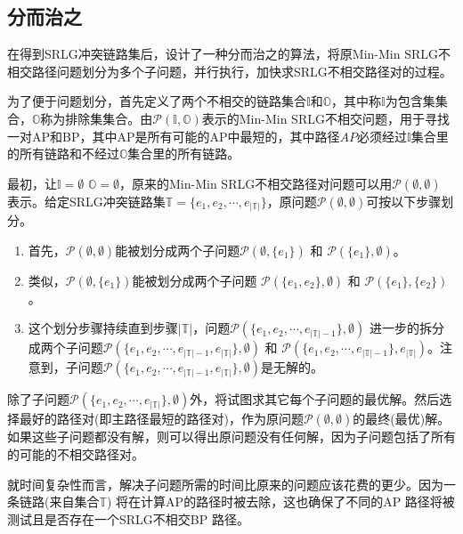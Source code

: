 \subsection{分而治之}
在得到SRLG冲突链路集后，设计了一种分而治之的算法，将原Min-Min SRLG不相交路径问题划分为多个子问题，并行执行，加快求SRLG不相交路径对的过程。

为了便于问题划分，首先定义了两个不相交的链路集合$\mathbb{I}$和$\mathbb{O}$，其中称$\mathbb{I}$为包含集集合，$\mathbb{O}$称为排除集集合。由$\mathcal{P}({\mathbb{I},\mathbb{O}})$表示的Min-Min SRLG不相交问题，用于寻找一对AP和BP，其中AP是所有可能的AP中最短的，其中路径$AP$必须经过$\mathbb{I}$集合里的所有链路和不经过$\mathbb{O}$集合里的所有链路。

最初，让$\mathbb{I}=\emptyset$ ${\mathbb{O}}=\emptyset$，原来的Min-Min SRLG不相交路径对问题可以用$\mathcal{P}(\emptyset,\emptyset)$ 表示。给定SRLG冲突链路集$\mathbb{T}=\{{e_1},{e_2}, \cdots ,{e_{\left| \mathbb{T} \right|}}\}$，原问题$\mathcal{P}(\emptyset,\emptyset)$可按以下步骤划分。

\begin{enumerate}
  \item 首先，$\mathcal{P}(\emptyset,\emptyset)$能被划分成两个子问题$\mathcal{P}(\emptyset,\{e_1\})$ 和 $\mathcal{P}(\{e_1\},\emptyset)$。
  \item 类似，$\mathcal{P}(\emptyset,\{e_1\})$能被划分成两个子问题 $\mathcal{P}(\{e_1,e_2\},\emptyset)$ 和 $\mathcal{P}(\{e_1\},\{e_2\})$。
  \item 这个划分步骤持续直到步骤$|\mathbb{T}|$，问题$\mathcal{P}(\{e_1,e_2,\cdots ,{e_{\left| \mathbb{T} \right|-1}}\},\emptyset)$ 进一步的拆分成两个子问题$\mathcal{P}(\{e_1,e_2,\cdots ,{e_{\left| \mathbb{T} \right|-1}}, {e_{\left| \mathbb{T} \right|}}\},\emptyset)$ 和 $\mathcal{P}(\{e_1,e_2,\cdots ,{e_{\left| \mathbb{T} \right|-1}}\},{e_{\left| \mathbb{T} \right|}})$。注意到，子问题$\mathcal{P}(\{e_1,e_2,\cdots ,{e_{\left| \mathbb{T} \right|-1}}, {e_{\left| \mathbb{T} \right|}}\},\emptyset)$是无解的。
\end{enumerate}



除了子问题$\mathcal{P}(\{e_1,e_2,\cdots ,{e_{\left| \mathbb{T} \right|}}\},\emptyset)$外，将试图求其它每个子问题的最优解。然后选择最好的路径对(即主路径最短的路径对)，作为原问题$\mathcal{P}(\emptyset,\emptyset)$的最终(最优)解。如果这些子问题都没有解，则可以得出原问题没有任何解，因为子问题包括了所有的可能的不相交路径对。

就时间复杂性而言，解决子问题所需的时间比原来的问题应该花费的更少。因为一条链路(来自集合$\mathbb{T}$) 将在计算AP的路径时被去除，这也确保了不同的AP 路径将被测试且是否存在一个SRLG不相交BP 路径。

